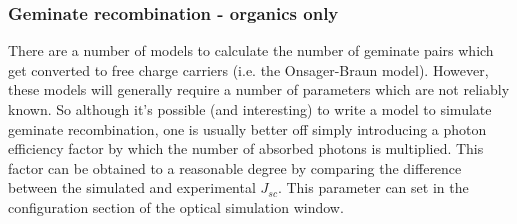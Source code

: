 
\subsubsection{Geminate recombination - organics only}
There are a number of models to calculate the number of geminate pairs which get converted to free charge carriers (i.e. the Onsager-Braun model).  However, these models will generally require a number of parameters which are not reliably known. So although it's possible (and interesting) to write a model to simulate geminate recombination, one is usually better off simply introducing a photon efficiency factor by which the number of absorbed photons is multiplied. This factor can be obtained to a reasonable degree by comparing the difference between the simulated and experimental $J_{sc}$.  This parameter can set in the configuration section of the optical simulation window.

